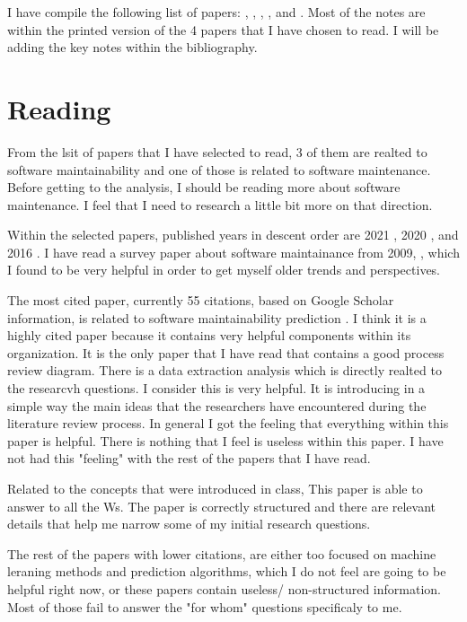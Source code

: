 \documentclass[article]{IEEEtran}
\begin{document}
I have compile the following list of papers:
\cite{alsolai2020systematic}, \cite{khezami2021systematic}, \cite{malhotra2016software}, \cite{malhotra2020systematic}, \cite{tian2021impact} and \cite{riaz2009systematic}.
Most of the notes are within the printed version of the 4 papers that I have chosen to read. I will be adding the key notes within the bibliography.

\section{Reading}
From the lsit of papers that I have selected to read, 3 of them are realted to software maintainability and one of those is related to software maintenance. Before getting to the analysis, I should be reading more about software maintenance. I feel that I need to research a little bit more on that direction.

Within the selected papers, published years in descent order are 2021 \cite{khezami2021systematic}, 2020 \cite{malhotra2020systematic}, \cite{alsolai2020systematic} and 2016 \cite{malhotra2016software}. I have read a survey paper about software maintainance from 2009, \cite{riaz2009systematic}, which I found to be very helpful in order to get myself older trends and perspectives.

The most cited paper, currently 55 citations, based on Google Scholar information, is related to software maintainability prediction \cite{alsolai2020systematic}. I think it is a highly cited paper because it contains very helpful components within its organization. It is the only paper that I have read that contains a good process review diagram. There is a data extraction analysis which is directly realted to the researcvh questions. I consider this is very helpful. It is introducing in a simple way the main ideas that the researchers have encountered during the literature review process. In general I got the feeling that everything within this paper is helpful. There is nothing that I feel is useless within this paper. I have not had this "feeling" with the rest of the papers that I have read.

Related to the concepts that were introduced in class, This paper is able to answer to all the Ws. The paper is correctly structured and there are relevant details that help me narrow some of my initial research questions.

The rest of the papers with lower citations, are either too focused on machine leraning methods and prediction algorithms, which I do not feel are going to be helpful right now, or these papers contain useless/ non-structured information. Most of those fail to answer the "for whom" questions specificaly to me.
\end{document}
